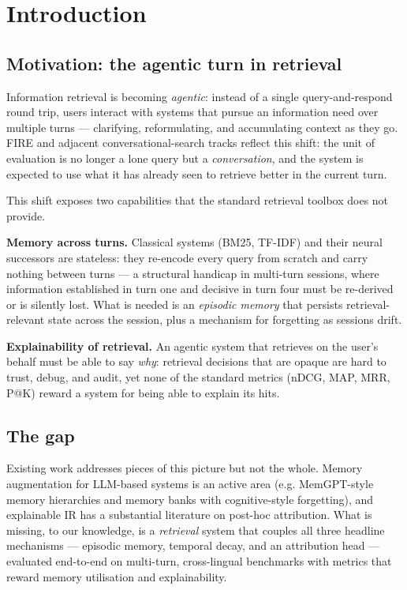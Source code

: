 \section{Introduction}
\label{sec:intro}

\subsection{Motivation: the agentic turn in retrieval}
\label{sec:intro-motivation}

Information retrieval is becoming \emph{agentic}: instead of a single query-and-respond round trip, users interact with systems that pursue an information need over multiple turns --- clarifying, reformulating, and accumulating context as they go. FIRE and adjacent conversational-search tracks reflect this shift: the unit of evaluation is no longer a lone query but a \emph{conversation}, and the system is expected to use what it has already seen to retrieve better in the current turn.

This shift exposes two capabilities that the standard retrieval toolbox does not provide.

\textbf{Memory across turns.} Classical systems (BM25, TF-IDF) and their neural successors are stateless: they re-encode every query from scratch and carry nothing between turns --- a structural handicap in multi-turn sessions, where information established in turn one and decisive in turn four must be re-derived or is silently lost. What is needed is an \emph{episodic memory} that persists retrieval-relevant state across the session, plus a mechanism for forgetting as sessions drift.

\textbf{Explainability of retrieval.} An agentic system that retrieves on the user's behalf must be able to say \emph{why}: retrieval decisions that are opaque are hard to trust, debug, and audit, yet none of the standard metrics (nDCG, MAP, MRR, P@K) reward a system for being able to explain its hits.

\subsection{The gap}
\label{sec:intro-gap}

Existing work addresses pieces of this picture but not the whole. Memory augmentation for LLM-based systems is an active area (e.g. MemGPT-style memory hierarchies and memory banks with cognitive-style forgetting), and explainable IR has a substantial literature on post-hoc attribution. What is missing, to our knowledge, is a \emph{retrieval} system that couples all three headline mechanisms --- episodic memory, temporal decay, and an attribution head --- evaluated end-to-end on multi-turn, cross-lingual benchmarks with metrics that reward memory utilisation and explainability.

